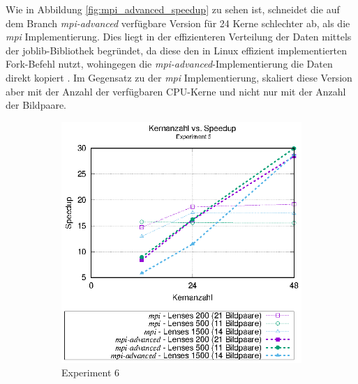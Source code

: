 Wie in Abbildung \ref{fig:mpi_advanced_speedup} \cite{Coj17} zu sehen ist, schneidet die auf dem Branch \textit{mpi-advanced} verfügbare Version für 24 Kerne schlechter ab, als die \textit{mpi} Implementierung. Dies liegt in der effizienteren Verteilung der Daten mittels der joblib-Bibliothek begründet, da diese den in Linux effizient implementierten Fork-Befehl nutzt, wohingegen die \textit{mpi-advanced}-Implementierung die Daten direkt kopiert \cite{GVB+18}. Im Gegensatz zu der \textit{mpi} Implementierung, skaliert diese Version aber mit der Anzahl der verfügbaren \gls{CPU}-Kerne und nicht nur mit der Anzahl der Bildpaare. 

\begin{center}
	\begin{figure}[htbp]
		\begin{subfigure}[b]{0.45\textwidth}
			\centering
			\includegraphics[width=\textwidth]{pdf/mpi_advanced_speedup_exp6}
			\caption{Experiment 6}
			\label{fig:mpi_advanced_speedup_exp6}
		\end{subfigure}
	\hfill
		\begin{subfigure}[b]{0.45\textwidth}
			\centering

\end{subfigure}
\end{figure}
\end{center}
